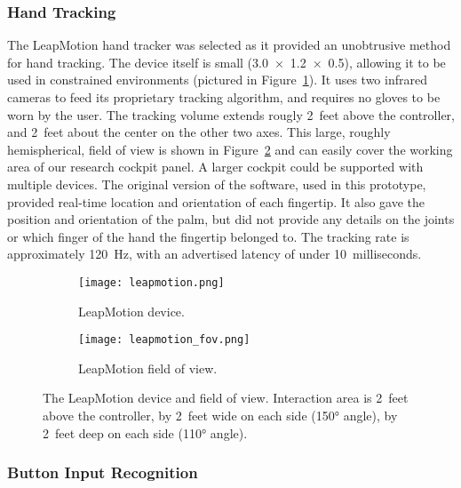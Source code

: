 \subsubsection{Hand Tracking}

The LeapMotion hand tracker was selected as it provided an unobtrusive method for hand tracking.
The device itself is small (\SI{3.0 x 1.2 x 0.5}{\inch}), allowing it to be used in constrained environments (pictured in Figure~\ref{fig:proto_leap_device}).
It uses two infrared cameras to feed its proprietary tracking algorithm, and requires no gloves to be worn by the user.
The tracking volume extends rougly \num{2}~feet above the controller, and \num{2}~feet about the center on the other two axes.
This large, roughly hemispherical, field of view is shown in Figure~\ref{fig:proto_leap_fov} and can easily cover the working area of our research cockpit panel.
A larger cockpit could be supported with multiple devices.
The original version of the software, used in this prototype, provided real-time location and orientation of each fingertip.
It also gave the position and orientation of the palm, but did not provide any details on the joints or which finger of the hand the fingertip belonged to.
The tracking rate is approximately \SI{120}{\hertz}, with an advertised latency of under \num{10}~milliseconds.

\mbox{}\hfill
\begin{figure}
    \centering
    \begin{subfigure}[t]{0.49\linewidth}
        \centering
        \texttt{[image: leapmotion.png]}
        \caption{LeapMotion device.}
        \label{fig:proto_leap_device}
    \end{subfigure}\hfill
    \begin{subfigure}[t]{0.49\linewidth}
        \centering
        \texttt{[image: leapmotion\_fov.png]}
        \caption{LeapMotion field of view.}
        \label{fig:proto_leap_fov}
    \end{subfigure}
    \caption{The LeapMotion device and field of view. Interaction area is \num{2}~feet above the controller, by \num{2}~feet wide on each side (\ang{150} angle), by \num{2}~feet deep on each side (\ang{110} angle).}
    \label{fig:proto_leap}
\end{figure}
\hfill\mbox{}

\subsubsection{Button Input Recognition}
\label{sec:proto_button_input}

